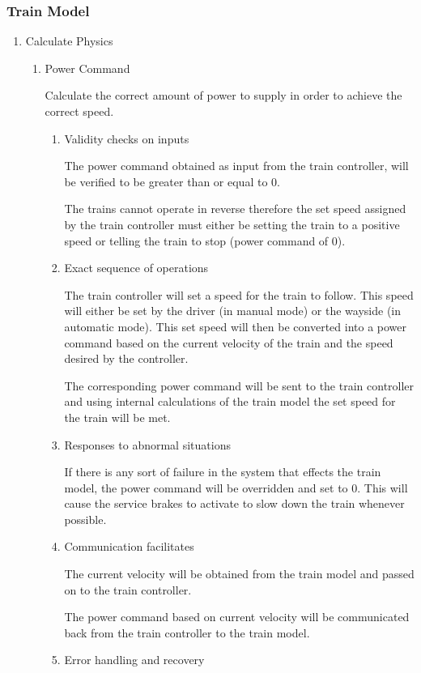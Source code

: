 \documentclass[11pt]{article}
\begin{document}
\subsubsection{Train Model}
\label{sec-3-1-4}
\begin{enumerate}
\item Calculate Physics
\label{sec-3-1-4-1}
\begin{enumerate}
\item Power Command
\label{sec-3-1-4-1-1}

Calculate the correct amount of power to supply in order to achieve the correct speed.
\begin{enumerate}
\item Validity checks on inputs
\label{sec-3-1-4-1-1-1}

The power command obtained as input from the train controller, will be verified to be greater than or equal to 0. 

The trains cannot operate in reverse therefore the set speed assigned by the train controller must either be setting the train to a positive speed or telling the train to stop (power command of 0).
\item Exact sequence of operations
\label{sec-3-1-4-1-1-2}

The train controller will set a speed for the train to follow. This speed will either be set by the driver (in manual mode) or the wayside (in automatic mode).
This set speed will then be converted into a power command based on the current velocity of the train and the speed desired by the controller. 

The corresponding power command will be sent to the train controller and using internal calculations of the train model the set speed for the train will be met.
\item Responses to abnormal situations
\label{sec-3-1-4-1-1-3}

If there is any sort of failure in the system that effects the train model, the power command will be overridden and set to 0. This will cause the service brakes to activate to slow down the train whenever possible.
\item Communication facilitates
\label{sec-3-1-4-1-1-4}

The current velocity will be obtained from the train model and passed on to the train controller.

The power command based on current velocity will be communicated back from the train controller to the train model.
\item Error handling and recovery
\label{sec-3-1-4-1-1-5}


\end{enumerate}
\end{enumerate}
\end{enumerate}
\end{document}
